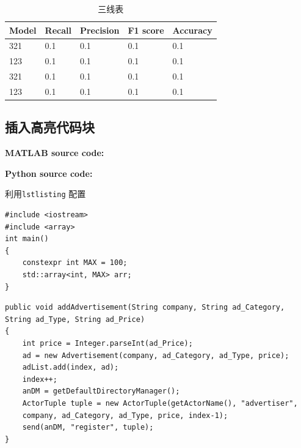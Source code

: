 \documentclass[12pt,hyperref,a4paper,UTF8]{ctexart}
\begin{document}
\begin{table}[!ht]
\caption{三线表}\label{tab:三线表}
\centering
\begin{tabularx}{\textwidth}{@{}lXXXX@{}} %
\toprule
Model & Recall & Precision & F1 score & Accuracy \\
\midrule
321 & 0.1 & 0.1 & 0.1 & 0.1 \\
123 & 0.1 & 0.1 & 0.1 & 0.1 \\
321 & 0.1 & 0.1 & 0.1 & 0.1 \\
123 & 0.1 & 0.1 & 0.1 & 0.1 \\
\bottomrule
\end{tabularx}
\end{table}
%
%
%
%
%
%

\subsection{插入高亮代码块}
\textbf{MATLAB source code:}

\textbf{Python source code:}

%

利用\verb|lstlisting| 配置
\begin{lstlisting}[style=CPP, title="c++代码"]
#include <iostream>
#include <array>
int main()
{
    constexpr int MAX = 100;
    std::array<int, MAX> arr;
}  
\end{lstlisting}

\begin{lstlisting}[style=Java, title="Java代码"]
public void addAdvertisement(String company, String ad_Category, String ad_Type, String ad_Price)
{
    int price = Integer.parseInt(ad_Price);
    ad = new Advertisement(company, ad_Category, ad_Type, price);
    adList.add(index, ad);
    index++;
    anDM = getDefaultDirectoryManager();
    ActorTuple tuple = new ActorTuple(getActorName(), "advertiser",
    company, ad_Category, ad_Type, price, index-1);
    send(anDM, "register", tuple);
}
\end{lstlisting}
\end{document}
